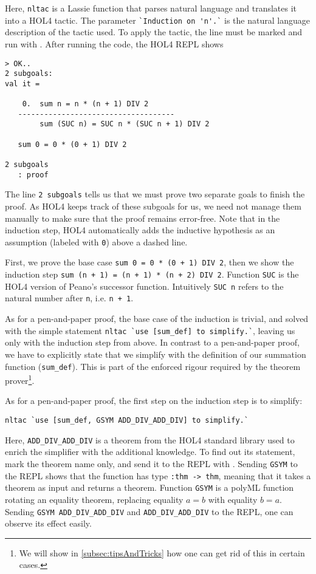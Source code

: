 Here, \lstinline{nltac} is a Lassie function that parses natural language and
translates it into a HOL4 tactic.
The parameter \lstinline{`Induction on 'n'.`} is the natural language
description of the tactic used.
To apply the tactic, the line must be marked and run with .
After running the code, the HOL4 REPL shows
\begin{lstlisting}
> OK..
2 subgoals:
val it =

    0.  sum n = n * (n + 1) DIV 2
   ------------------------------------
        sum (SUC n) = SUC n * (SUC n + 1) DIV 2

   sum 0 = 0 * (0 + 1) DIV 2

2 subgoals
   : proof
\end{lstlisting}

The line \lstinline{2 subgoals} tells us that we must prove two separate goals
to finish the proof.
As HOL4 keeps track of these subgoals for us, we need not manage them manually
to make sure that the proof remains error-free.
Note that in the induction step, HOL4 automatically adds the inductive
hypothesis as an assumption (labeled with \lstinline{0}) above a dashed line.

First, we prove the base case \lstinline{sum 0 = 0 * (0 + 1) DIV 2}, then we
show the induction step \lstinline{sum (n + 1) = (n + 1) * (n + 2) DIV 2}.
Function \lstinline{SUC} is the HOL4 version of Peano's successor function.
Intuitively \lstinline{SUC n} refers to the natural number after \lstinline{n},
i.e. \lstinline{n + 1}.

As for a pen-and-paper proof, the base case of the induction is trivial, and
solved with the simple statement \lstinline{nltac `use [sum_def] to simplify.`},
leaving us only with the induction step from above.
In contrast to a pen-and-paper proof, we have to explicitly state that we
simplify with the definition of our summation function (\lstinline{sum_def}).
This is part of the enforced rigour required by the theorem prover\footnote{
We will show in \autoref{subsec:tipsAndTricks} how one can get rid of this in certain cases.}.

As for a pen-and-paper proof, the first step on the induction step is to
simplify:
\begin{lstlisting}
nltac `use [sum_def, GSYM ADD_DIV_ADD_DIV] to simplify.`
\end{lstlisting}

Here, \lstinline{ADD_DIV_ADD_DIV} is a theorem from the HOL4 standard library
used to enrich the simplifier with the additional knowledge.
To find out its statement, mark the theorem name only, and send it to the
REPL with .
Sending \lstinline{GSYM} to the REPL shows that the function has type
\lstinline{:thm -> thm}, meaning that it takes a theorem as input and returns a
theorem.
Function \lstinline{GSYM} is a polyML function rotating an equality theorem,
replacing equality $a = b$ with equality $b = a$.
Sending \lstinline{GSYM ADD_DIV_ADD_DIV} and \lstinline{ADD_DIV_ADD_DIV} to the REPL, one can
observe its effect easily.

